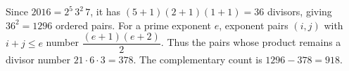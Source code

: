 Since $2016=2^5\,3^2\,7$, it has $(5+1)(2+1)(1+1)=36$ divisors, giving $36^2=1296$ ordered pairs. For a prime exponent $e$, exponent pairs $(i,j)$ with $i+j\le e$ number $\dfrac{(e+1)(e+2)}{2}$. Thus the pairs whose product remains a divisor number $21\cdot6\cdot3=378$. The complementary count is $\boxed{1296-378=918}$.
